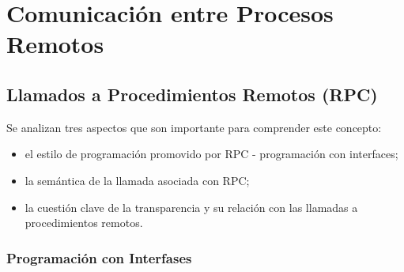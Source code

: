 
\setchapterpreamble[u]{\margintoc}

\chapter{Comunicación entre Procesos Remotos }
\label{ch:Comunicación entre Procesos}



\section{Llamados a Procedimientos Remotos (RPC)}
\label{sec:RPC}

Se analizan tres aspectos que son importante para comprender este concepto:
\begin{itemize}
	\item el estilo de programación promovido por RPC - programación con interfaces;
	\item la semántica de la llamada asociada con RPC;
	\item  la cuestión clave de la transparencia y su relación con las llamadas a procedimientos remotos.
\end{itemize}

\subsection*{Programaci\'on con Interfases}

